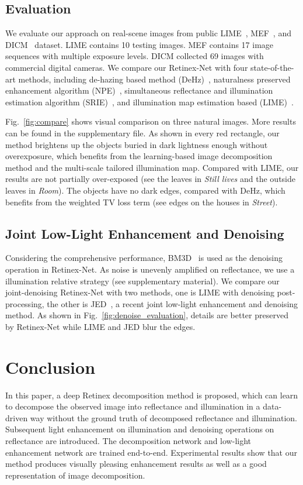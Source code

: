 \documentclass{bmvc2k}
\begin{document}
\subsection{Evaluation}
We evaluate our approach on real-scene images from public LIME~\cite{Guo2017LIME}, MEF~\cite{Ma2015Perceptual}, and DICM~\cite{Lee2013Contrast} dataset. LIME contains 10 testing images. MEF contains 17 image sequences with multiple exposure levels. DICM collected 69 images with commercial digital cameras. We compare our Retinex-Net with four state-of-the-art methods, including de-hazing based method (DeHz)~\cite{Dong2011Fast}, naturalness preserved enhancement algorithm (NPE)~\cite{Wang2013Naturalness}, simultaneous reflectance and illumination estimation algorithm (SRIE)~\cite{Fu2016A}, and illumination map estimation based (LIME)~\cite{Guo2017LIME}.

Fig.~\ref{fig:compare} shows visual comparison on three natural images. More results can be found in the supplementary file. As shown in every red rectangle, our method brightens up the objects buried in dark lightness enough without overexposure, which benefits from the learning-based image decomposition method and the multi-scale tailored illumination map. Compared with LIME, our results are not partially over-exposed (see the leaves in \emph{Still lives} and the outside leaves in \emph{Room}). The objects have no dark edges, compared with DeHz, which benefits from the weighted TV loss term (see edges on the houses in \emph{Street}).

\subsection{Joint Low-Light Enhancement and Denoising}
Considering the comprehensive performance, BM3D~\cite{dabov2006image} is used as the denoising operation in Retinex-Net. As noise is unevenly amplified on reflectance, we use a illumination relative strategy (see supplementary material). We compare our joint-denoising Retinex-Net with two methods, one is LIME with denoising post-processing, the other is JED~\cite{ren2018joint}, a recent joint low-light enhancement and denoising method. As shown in Fig.~\ref{fig:denoise_evaluation}, details are better preserved by Retinex-Net while LIME and JED blur the edges.

\section{Conclusion}
In this paper, a deep Retinex decomposition method is proposed, which can learn to decompose the observed image into reflectance and illumination in a data-driven way without the ground truth of decomposed reflectance and illumination. Subsequent light enhancement on illumination and denoising operations on reflectance are introduced. The decomposition network and low-light enhancement network are trained end-to-end. Experimental results show that our method produces visually pleasing enhancement results as well as a good representation of image decomposition.

\end{document}
